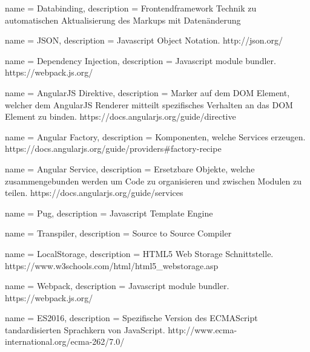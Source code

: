 { 
  name = Databinding,
  description = { Frontendframework Technik zu automatischen Aktualisierung des Markups mit Datenänderung }
}

{
  name = JSON,
  description = { Javascript Object Notation. http://json.org/ }
}

{
  name = Dependency Injection,
  description = { Javascript module bundler.  https://webpack.js.org/ }
}

{
  name = AngularJS Direktive,
  description = { Marker auf dem DOM Element, welcher dem AngularJS Renderer mitteilt spezifisches Verhalten an das DOM Element zu binden. https://docs.angularjs.org/guide/directive }
}

{
  name = Angular Factory,
  description = { Komponenten, welche Services erzeugen. https://docs.angularjs.org/guide/providers\#factory-recipe }
}


{
  name = Angular Service,
  description = { Ersetzbare Objekte, welche zusammengebunden werden um Code zu organisieren und zwischen Modulen zu teilen. https://docs.angularjs.org/guide/services }
}

{
  name = Pug,
  description = { Javascript Template Engine }
}

{
  name = Transpiler,
  description = {Source to Source Compiler}
}

{
  name = LocalStorage,
  description = { HTML5 Web Storage Schnittstelle. https://www.w3schools.com/html/html5\_webstorage.asp }
}


{
  name = Webpack,
  description = { Javascript module bundler. https://webpack.js.org/ }
}

{
  name = ES2016,
  description = { Spezifische Version des ECMAScript tandardisierten Sprachkern von JavaScript. http://www.ecma-international.org/ecma-262/7.0/ }
}

